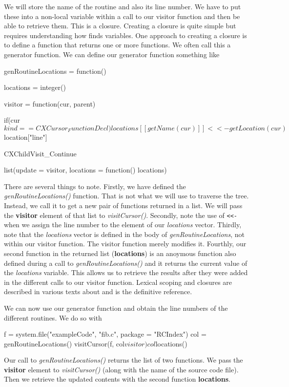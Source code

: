 \documentclass[article]{jss}
\def\R{\proglang{R}}
\def\Rfunc#1{\textsl{#1()}}
\def\Rvar#1{\textsl{#1}}
\def\Rel#1{\textbf{#1}}
\begin{document}
We will store the name of the routine and also its line number.
We have to put these into a non-local variable within a call to our
visitor  function and then be able to retrieve them. This is a closure.
Creating a closure is quite simple but requires understanding how \R{}
finds variables.  One approach to creating a closure is to define a
function that returns one or more functions.  We often call this a
generator function.
We can define our generator function something like
\begin{RCode}
genRoutineLocations = 
function() 
{
   locations = integer()

    visitor = function(cur, parent) {
       if(cur$kind == CXCursor_FunctionDecl) 
         locations[[ getName(cur) ]] <<- getLocation(cur)$location["line"]

        CXChildVisit_Continue
    }

    list(update = visitor, locations = function() locations)
}
\end{RCode}
There are several things to note.  Firstly, we have defined the
\Rfunc{genRoutineLocations} function. That is not what we will use to
traverse the tree. Instead, we call it to get a new pair of functions
returned in a list.  We will pass the \Rel{visitor} element of that
list to \Rfunc{visitCursor}.  Secondly, note the use of \verb+<<-+
when we assign the line number to the element of our \Rvar{locations}
vector.  Thirdly, note that the \Rvar{locations} vector is defined in
the body of \Rvar{genRoutineLocations}, not within our visitor
function. The visitor function merely modifies it.  Fourthly, our
second function in the returned list (\Rel{locations}) is an anoymous
function also defined during a call to \Rfunc{genRoutineLocations} and
it returns the current value of the \Rvar{locations} variable.  This
allows us to retrieve the results after they were added in the
different calls to our visitor function.  Lexical scoping and closures
are described in various texts about \R and \cite{bib:LexicalScoping}
is the definitive reference.

We can now use our generator function and obtain the line numbers of
the different routines. We do so with
\begin{RCode}
f = system.file("exampleCode", "fib.c", package = "RCIndex")
col = genRoutineLocations()
visitCursor(f, col$visitor)
col$locations()
\end{RCode}
Our call to \Rfunc{genRoutineLocations} returns the list of two
functions.
We pass the \Rel{visitor} element  to \Rfunc{visitCursor} (along with
the name of the source code file).
Then we retrieve the updated contents with the second function \Rel{locations}.
\end{document}
